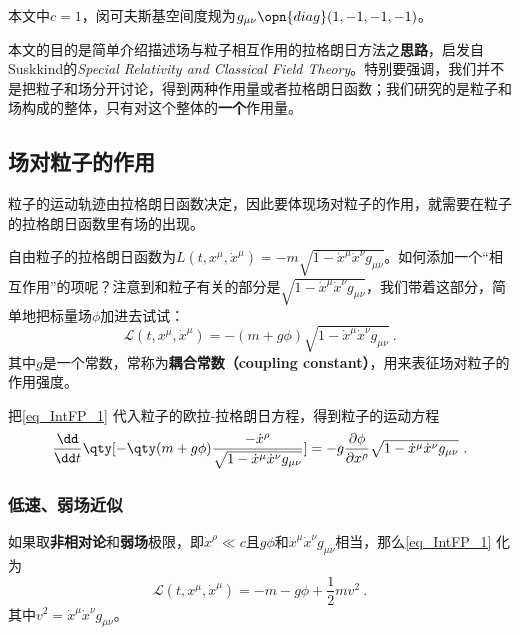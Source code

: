 

本文中$c=1$，闵可夫斯基空间度规为$g_{\mu\nu}\opn{diag}(1, -1, -1, -1)$。

本文的目的是简单介绍描述场与粒子相互作用的拉格朗日方法之\textbf{思路}，启发自Suskkind的\textsl{Special Relativity and Classical Field Theory}\cite{SusskindClassicalFields}。特别要强调，我们并不是把粒子和场分开讨论，得到两种作用量或者拉格朗日函数；我们研究的是粒子和场构成的整体，只有对这个整体的\textbf{一个}作用量。

\subsection{场对粒子的作用}

粒子的运动轨迹由拉格朗日函数决定，因此要体现场对粒子的作用，就需要在粒子的拉格朗日函数里有场的出现。

自由粒子的拉格朗日函数为$L(t, x^\mu, \dot{x}^\mu ) = -m\sqrt{1-\dot{x}^\mu \dot{x}^\nu g_{\mu\nu}}$。如何添加一个“相互作用”的项呢？注意到和粒子有关的部分是$\sqrt{1-\dot{x}^\mu \dot{x}^\nu g_{\mu\nu}}$，我们带着这部分，简单地把标量场$\phi$加进去试试：
\begin{equation}\label{eq_IntFP_1}
\mathcal{L}(t, x^\mu, \dot{x}^\mu ) = -(m+g\phi)\sqrt{1-\dot{x}^\mu \dot{x}^\nu g_{\mu\nu}}~.
\end{equation}
其中$g$是一个常数，常称为\textbf{耦合常数（coupling constant）}，用来表征场对粒子的作用强度。

把\autoref{eq_IntFP_1} 代入粒子的欧拉-拉格朗日方程，得到粒子的运动方程
\begin{equation}\label{eq_IntFP_2}
\frac{\dd }{\dd t} \qty[-\qty(m+g\phi)\frac{-\dot{x}^\rho}{\sqrt{1-\dot{x}^\mu \dot{x}^\nu g_{\mu\nu}}}] = -g\frac{\partial \phi}{\partial x^\rho}\sqrt{1-\dot{x}^\mu \dot{x}^\nu g_{\mu\nu}}~.
\end{equation}


\subsubsection{低速、弱场近似}

如果取\textbf{非相对论}和\textbf{弱场}极限，即$\dot{x}^\rho\ll c$且$g\phi$和$\dot{x}^\mu \dot{x}^\nu g_{\mu\nu}$相当，那么\autoref{eq_IntFP_1} 化为
\begin{equation}\label{eq_IntFP_3}
\mathcal{L}(t, x^\mu, \dot{x}^\mu ) = -m-g\phi+\frac{1}{2}mv^2~.
\end{equation}
其中$v^2=\dot{x}^\mu \dot{x}^\nu g_{\mu\nu}$。

